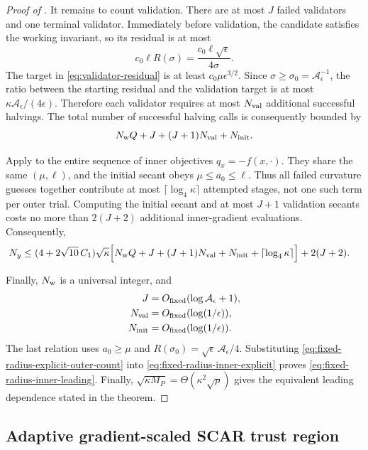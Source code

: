 \documentclass{article}
\begin{document}
\begin{proof}[Proof of ]
It remains to count validation.  There are at most $J$ failed
validators and one terminal validator.  Immediately before validation,
the candidate satisfies the working invariant, so its residual is at
most
\[
 c_0\ell R(\sigma)
 =\frac{c_0\ell\sqrt\epsilon}{4\sigma}.
\]
The target in \eqref{eq:validator-residual} is at least
$c_0\mu\epsilon^{3/2}$.  Since
$\sigma\ge\sigma_0=\mathcal A_\epsilon^{-1}$, the ratio between the
starting residual and the validation target is at most
$\kappa\mathcal A_\epsilon/(4\epsilon)$.  Therefore each validator
requires at most $N_{\rm val}$ additional successful halvings.  The
total number of successful halving calls is consequently bounded by
\[
 N_{\rm w}Q+J+(J+1)N_{\rm val}+N_{\rm init}.
\]

Apply  to the entire sequence of inner
objectives $q_x=-f(x,\cdot)$.  They share the same $(\mu,\ell)$, and
the initial secant obeys $\mu\le a_0\le\ell$.  Thus all failed
curvature guesses together contribute at most
$\lceil\log_4\kappa\rceil$ attempted stages, not one such term per
outer trial.  Computing the initial secant and at most $J+1$
validation secants costs no more than $2(J+2)$ additional
inner-gradient evaluations.  Consequently,
\begin{align}
 N_y\le{}&(4+2\sqrt{10}\,C_1)\sqrt\kappa
 \Bigl[
  N_{\rm w}Q+J+(J+1)N_{\rm val}+N_{\rm init}
  +\lceil\log_4\kappa\rceil
 \Bigr]
 +2(J+2).
 \label{eq:fixed-radius-inner-explicit}
\end{align}

Finally, $N_{\rm w}$ is a universal integer, and
\[
 \begin{aligned}
 J&=O_{\rm fixed}(\log\mathcal A_\epsilon+1),\\
 N_{\rm val}&=O_{\rm fixed}(\log(1/\epsilon)),\\
 N_{\rm init}&=O_{\rm fixed}(\log(1/\epsilon)).
 \end{aligned}
\]
The last relation uses $a_0\ge\mu$ and
$R(\sigma_0)=\sqrt\epsilon\,\mathcal A_\epsilon/4$.  Substituting
\eqref{eq:fixed-radius-explicit-outer-count} into
\eqref{eq:fixed-radius-inner-explicit} proves
\eqref{eq:fixed-radius-inner-leading}.  Finally,
$\sqrt{\kappa M_P}=\Theta(\kappa^2\sqrt\rho)$ gives the equivalent
leading dependence stated in the theorem.
\end{proof}

\subsection{Adaptive gradient-scaled SCAR trust region}
\label{app:gradient-scaled-proofs}
\end{document}
